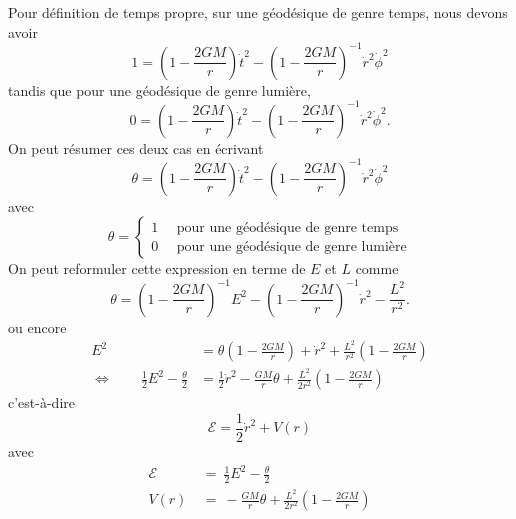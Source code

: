 \documentclass[a4paper,11pt]{report}
\begin{document}
            Pour définition de temps propre, sur une géodésique de genre temps, nous devons avoir
            \begin{equation}
                1 = \left( 1-\frac{2GM}{r} \right)\dot{t}^2-\left( 1-\frac{2GM}{r} \right)^{-1}\dot{r}^2\dot{\phi}^2
            \end{equation}
            tandis que pour une géodésique de genre lumière,
            \begin{equation}
                0 = \left( 1-\frac{2GM}{r} \right)\dot{t}^2-\left( 1-\frac{2GM}{r} \right)^{-1}\dot{r}^2\dot{\phi}^2.
            \end{equation}
            On peut résumer ces deux cas en écrivant
            \begin{equation}
                \theta = \left( 1-\frac{2GM}{r} \right)\dot{t}^2-\left( 1-\frac{2GM}{r} \right)^{-1}\dot{r}^2\dot{\phi}^2
            \end{equation}
            avec 
            \begin{equation}
                \theta =
                \begin{cases}
                    1 \quad\text{ pour une géodésique de genre temps}\\
                    0 \quad\text{ pour une géodésique de genre lumière}
                \end{cases}
            \end{equation}
            On peut reformuler cette expression en terme de $E$ et $L$ comme
            \begin{equation}
                \theta = \left( 1-\frac{2GM}{r} \right)^{-1} E^2-\left( 1-\frac{2GM}{r} \right)^{-1}\dot{r}^2-\frac{L^2}{r^2}.
            \end{equation}
            ou encore
            \begin{align}
                E^2 &= \theta \left( 1-\frac{2GM}{r} \right)+\dot{r}^2+\frac{L^2}{r^2}\left( 1-\frac{2GM}{r} \right)\\
                \Leftrightarrow\qquad \frac{1}{2}E^2-\frac{\theta}{2} &= \frac{1}{2}\dot{r}^2-\frac{GM}{r}\theta+\frac{L^2}{2r^2}\left( 1-\frac{2GM}{r} \right)
            \end{align}
            c'est-à-dire
            \begin{equation}
                \mathscr{E} = \frac{1}{2}\dot{r}^2 + V(r)
            \end{equation}
            avec 
            \begin{align}
                \mathscr{E} &~\hat{=}~ \frac{1}{2}E^2-\frac{\theta}{2}\\
                V(r) &~\hat{=}~ -\frac{GM}{r}\theta+\frac{L^2}{2r^2}\left( 1-\frac{2GM}{r} \right)
            \end{align}
\end{document}
